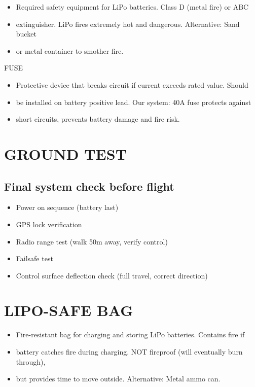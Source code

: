 \documentclass[11pt,letterpaper]{article}
\begin{document}
\begin{itemize}
  \item Required safety equipment for LiPo batteries. Class D (metal fire) or ABC
  \item extinguisher. LiPo fires extremely hot and dangerous. Alternative: Sand bucket
  \item or metal container to smother fire.
\end{itemize}

FUSE\par

\begin{itemize}
  \item Protective device that breaks circuit if current exceeds rated value. Should
  \item be installed on battery positive lead. Our system: 40A fuse protects against
  \item short circuits, prevents battery damage and fire risk.
\end{itemize}

\section{GROUND TEST}

\subsection{Final system check before flight}

\begin{itemize}
  \item Power on sequence (battery last)
  \item GPS lock verification
  \item Radio range test (walk 50m away, verify control)
  \item Failsafe test
  \item Control surface deflection check (full travel, correct direction)
\end{itemize}

\section{LIPO-SAFE BAG}

\begin{itemize}
  \item Fire-resistant bag for charging and storing LiPo batteries. Contains fire if
  \item battery catches fire during charging. NOT fireproof (will eventually burn through),
  \item but provides time to move outside. Alternative: Metal ammo can.
\end{itemize}
\end{document}
